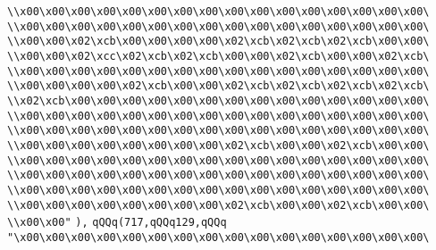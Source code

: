\verb|\\x00\x00\x00\x00\x00\x00\x00\x00\x00\x00\x00\x00\x00\x00\x00\x00\|\newline
\verb|\\x00\x00\x00\x00\x00\x00\x00\x00\x00\x00\x00\x00\x00\x00\x00\x00\|\newline
\verb|\\x00\x00\x02\xcb\x00\x00\x00\x00\x02\xcb\x02\xcb\x02\xcb\x00\x00\|\newline
\verb|\\x00\x00\x02\xcc\x02\xcb\x02\xcb\x00\x00\x02\xcb\x00\x00\x02\xcb\|\newline
\verb|\\x00\x00\x00\x00\x00\x00\x00\x00\x00\x00\x00\x00\x00\x00\x00\x00\|\newline
\verb|\\x00\x00\x00\x00\x02\xcb\x00\x00\x02\xcb\x02\xcb\x02\xcb\x02\xcb\|\newline
\verb|\\x02\xcb\x00\x00\x00\x00\x00\x00\x00\x00\x00\x00\x00\x00\x00\x00\|\newline
\verb|\\x00\x00\x00\x00\x00\x00\x00\x00\x00\x00\x00\x00\x00\x00\x00\x00\|\newline
\verb|\\x00\x00\x00\x00\x00\x00\x00\x00\x00\x00\x00\x00\x00\x00\x00\x00\|\newline
\verb|\\x00\x00\x00\x00\x00\x00\x00\x00\x02\xcb\x00\x00\x02\xcb\x00\x00\|\newline
\verb|\\x00\x00\x00\x00\x00\x00\x00\x00\x00\x00\x00\x00\x00\x00\x00\x00\|\newline
\verb|\\x00\x00\x00\x00\x00\x00\x00\x00\x00\x00\x00\x00\x00\x00\x00\x00\|\newline
\verb|\\x00\x00\x00\x00\x00\x00\x00\x00\x00\x00\x00\x00\x00\x00\x00\x00\|\newline
\verb|\\x00\x00\x00\x00\x00\x00\x00\x00\x02\xcb\x00\x00\x02\xcb\x00\x00\|\newline
\verb|\\x00\x00"|\newline
\verb|),|\newline
\verb|qQQq(717,qQQq129,qQQq|\newline
\verb|"\x00\x00\x00\x00\x00\x00\x00\x00\x00\x00\x00\x00\x00\x00\x00\x00\|\newline
